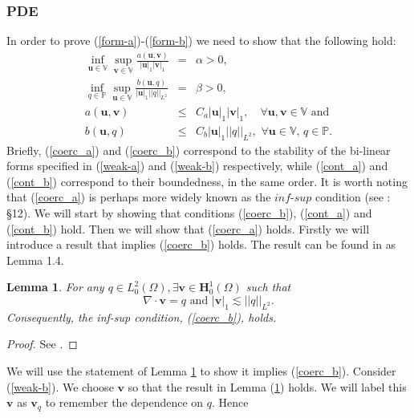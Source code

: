 \documentclass[12pt,a4paper]{article}
\newtheorem{lemma}[theorem]{Lemma}
\theoremstyle{definition}
\begin{document}
\subsubsection{PDE}\label{PDE_cont}
In order to prove (\ref{form-a})-(\ref{form-b}) we need to show that the following hold:
	 \begin{eqnarray}\label{coerc_a}
	\inf_{\textbf{u}\in \mathbb{V}}\sup_{\textbf{v}\in \mathbb{V}}\frac{a\left(\textbf{u},\textbf{v}\right)}{\left|\textbf{u}\right|_1 \left|\textbf{v}\right|_1}&=&\alpha>0,\\\label{coerc_b}
			\inf_{q\in \mathbb{P}}\sup_{\textbf{u}\in \mathbb{V}}\frac{b\left(\textbf{u},q\right)}{\left|\textbf{u}\right|_1 \left|\left|q\right|\right|_{L^2}}&=&\beta>0,\\\label{cont_a}
		a\left(\textbf{u},\textbf{v}\right)&\leq& C_a\left|\textbf{u}\right|_1\left|\textbf{v}\right|_1,\quad \forall \textbf{u},\textbf{v} \in \mathbb{V}\text{ and}\\\label{cont_b}
		b\left(\textbf{u},q\right)&\leq& C_b\left|\textbf{u}\right|_1\left|\left|q\right|\right|_{L^2},\,\,\forall \textbf{u} \in \mathbb{V},\, q \in \mathbb{P}.
	\end{eqnarray}
Briefly, (\ref{coerc_a}) and (\ref{coerc_b}) correspond to the stability of the bi-linear forms specified in (\ref{weak-a}) and (\ref{weak-b}) respectively, while (\ref{cont_a}) and (\ref{cont_b}) correspond to their boundedness, in the same order. It is worth noting that (\ref{coerc_a}) is perhaps more widely known as the $\textit{inf-sup}$ condition (see \cite{brenner2007mathematical}: \S 12). 
We will start by showing that conditions (\ref{coerc_b}), (\ref{cont_a}) and (\ref{cont_b}) hold.  Then we will show that (\ref{coerc_a}) holds.  Firstly we will introduce a result that implies (\ref{coerc_b}) holds.  The result can be found in \cite{Chen2016} as Lemma 1.4.
\begin{lemma}\label{Lemma_equiv}
	For any $q\in L^2_0\left(\Omega\right), \exists \textbf{v}\in \textbf{H}^1_0\left(\Omega\right)$ such that
	\begin{equation}
		\nabla \cdot \textbf{v}= q \text{ and } \left|\textbf{v}\right|_1 \lesssim \left|\left|q\right|\right|_{L^2}\nonumber.
	\end{equation}
	Consequently, the inf-sup condition, (\ref{coerc_b}), holds.
\end{lemma}
\begin{proof}
	See \cite[Lemma 1.4]{Chen2016}.
\end{proof}
We will use the statement of Lemma \ref{Lemma_equiv} to show it implies (\ref{coerc_b}).  Consider (\ref{weak-b}).  We choose $\textbf{v}$ so that the result in Lemma (\ref{Lemma_equiv}) holds. We will label this $\textbf{v}$ as $\textbf{v}_q$ to remember the dependence on $q$.   Hence
\end{document}

